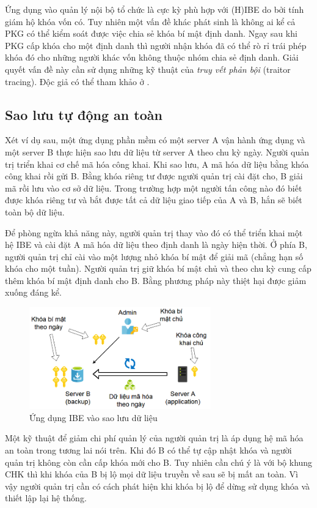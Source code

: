 \documentclass[class=report, crop=false]{standalone}
\begin{document}
			Ứng dụng vào quản lý nội bộ tổ chức là cực kỳ phù hợp với (H)IBE do bởi tính giám hộ khóa vốn có. Tuy nhiên một vấn đề khác phát sinh là không ai kể cả PKG có thể kiểm soát được việc chia sẻ khóa bí mật định danh. Ngay sau khi PKG cấp khóa cho một định danh thì người nhận khóa đã có thể rò rỉ trái phép khóa đó cho những người khác vốn không thuộc nhóm chia sẻ định danh. Giải quyết vấn đề này cần sử dụng những kỹ thuật của \textit{truy vết phản bội} (traitor tracing). Độc giả có thể tham khảo ở \cite{DBLP:conf/pkc/AbdallaDMNPS07}.
		\subsection{Sao lưu tự động an toàn}
			Xét ví dụ sau, một ứng dụng phần mềm có một server A vận hành ứng dụng và một server B thực hiện sao lưu dữ liệu từ server A theo chu kỳ ngày. Người quản trị triển khai cơ chế mã hóa công khai. Khi sao lưu, A mã hóa dữ liệu bằng khóa công khai rồi gửi B. Bằng khóa riêng tư được người quản trị cài đặt cho, B giải mã rồi lưu vào cơ sở dữ liệu. Trong trường hợp một người tấn công nào đó biết được khóa riêng tư và bắt được tất cả dữ liệu giao tiếp của A và B, hắn sẽ biết toàn bộ dữ liệu.
			
			Để phòng ngừa khả năng này, người quản trị thay vào đó có thể triển khai một hệ IBE và cài đặt A mã hóa dữ liệu theo định danh là ngày hiện thời. Ở phía B, người quản trị chỉ cài vào một lượng nhỏ khóa bí mật để giải mã (chẳng hạn số khóa cho một tuần). Người quản trị giữ khóa bí mật chủ và theo chu kỳ cung cấp thêm khóa bí mật định danh cho B. Bằng phương pháp này thiệt hại được giảm xuống đáng kể.
			\begin{figure}[h] 
				\captionsetup{font=normalsize}
				\includegraphics[width=0.7\textwidth]{application_backup.png}
				\centering
				\caption{Ứng dụng IBE vào sao lưu dữ liệu}
			\end{figure}

			Một kỹ thuật để giảm chi phí quản lý của người quản trị là áp dụng hệ mã hóa an toàn trong tương lai nói trên. Khi đó B có thể tự cập nhật khóa và người quản trị không còn cần cấp khóa mới cho B. Tuy nhiên cần chú ý là với bộ khung CHK thì khi khóa của B bị lộ mọi dữ liệu truyền về sau sẽ bị mất an toàn. Vì vậy người quản trị cần có cách phát hiện khi khóa bị lộ để dừng sử dụng khóa và thiết lập lại hệ thống.
\end{document}
